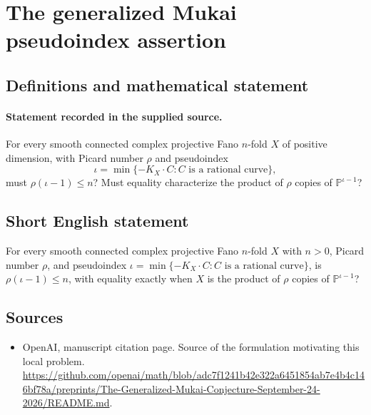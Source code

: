 \documentclass[11pt]{article}
\begin{document}
\section*{The generalized Mukai pseudoindex assertion}\label{statement}
\subsection{Definitions and mathematical statement}
\paragraph{Statement recorded in the supplied source.}
For every smooth connected complex projective Fano $n$-fold $X$ of positive dimension, with Picard number $\rho$ and pseudoindex
\[
\iota=\min\{-K_X\cdot C: C\text{ is a rational curve}\},
\]
must $\rho(\iota-1)\leq n$? Must equality characterize the product of $\rho$ copies of $\mathbb{P}^{\iota-1}$?
\subsection{Short English statement}
For every smooth connected complex projective Fano $n$-fold $X$ with $n>0$, Picard number $\rho$, and pseudoindex $\iota=\min\{-K_X\cdot C:C\text{ is a rational curve}\}$, is $\rho(\iota-1)\leq n$, with equality exactly when $X$ is the product of $\rho$ copies of $\mathbb{P}^{\iota-1}$?
\subsection{Sources}
\begin{itemize}
\item[S1] OpenAI, manuscript citation page. Source of the formulation motivating this local problem.
\url{https://github.com/openai/math/blob/adc7f1241b42e322a6451854ab7e4b4c146bf78a/preprints/The-Generalized-Mukai-Conjecture-September-24-2026/README.md}.
\end{itemize}
\end{document}
